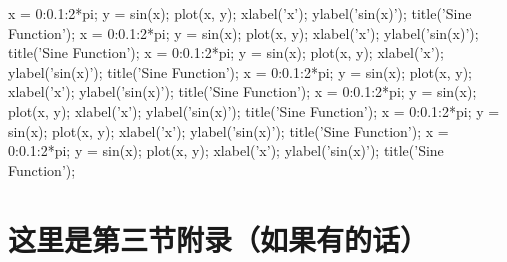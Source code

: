 \documentclass[zihao=-4, UTF8]{article}		%
\theoremstyle{MyLineTheoremStyle} %
\theoremstyle{MyBlockTheoremStyle} %
\theoremstyle{MySubsubsectionStyle} %
\begin{document}
\begin{matlablisting}
x = 0:0.1:2*pi;
y = sin(x);
plot(x, y);
xlabel('x');
ylabel('sin(x)');
title('Sine Function');
x = 0:0.1:2*pi;
y = sin(x);
plot(x, y);
xlabel('x');
ylabel('sin(x)');
title('Sine Function');
x = 0:0.1:2*pi;
y = sin(x);
plot(x, y);
xlabel('x');
ylabel('sin(x)');
title('Sine Function');
x = 0:0.1:2*pi;
y = sin(x);
plot(x, y);
xlabel('x');
ylabel('sin(x)');
title('Sine Function');
x = 0:0.1:2*pi;
y = sin(x);
plot(x, y);
xlabel('x');
ylabel('sin(x)');
title('Sine Function');
x = 0:0.1:2*pi;
y = sin(x);
plot(x, y);
xlabel('x');
ylabel('sin(x)');
title('Sine Function');
x = 0:0.1:2*pi;
y = sin(x);
plot(x, y);
xlabel('x');
ylabel('sin(x)');
title('Sine Function');
\end{matlablisting}

\section{这里是第三节附录（如果有的话）}
\end{document}
